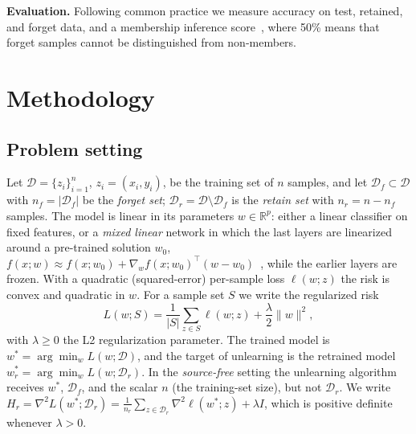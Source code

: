 \documentclass[10pt,twocolumn,letterpaper]{article}
\begin{document}
\noindent\textbf{Evaluation.} Following common practice we measure accuracy on test, retained, and forget data, and a membership inference score~\cite{shokri2017membership}, where 50\% means that forget samples cannot be distinguished from non-members.

\section{Methodology}
\label{sec:method}
\subsection{Problem setting}
\label{sec:setting}
Let $\mathcal D=\{z_i\}_{i=1}^{n}$, $z_i=(x_i,y_i)$, be the training set of $n$ samples, and let $\mathcal D_f\subset\mathcal D$ with $n_f=|\mathcal D_f|$ be the \emph{forget set}; $\mathcal D_r=\mathcal D\setminus\mathcal D_f$ is the \emph{retain set} with $n_r=n-n_f$ samples. The model is linear in its parameters $w\in\mathbb R^{p}$: either a linear classifier on fixed features, or a \emph{mixed linear} network in which the last layers are linearized around a pre-trained solution $w_0$, $f(x;w)\approx f(x;w_0)+\nabla_w f(x;w_0)^\top(w-w_0)$~\cite{golatkar2021mixed,lee2019wide}, while the earlier layers are frozen. With a quadratic (squared-error) per-sample loss $\ell(w;z)$ the risk is convex and quadratic in $w$. For a sample set $S$ we write the regularized risk
\begin{equation}
  L(w;S)=\frac1{|S|}\sum_{z\in S}\ell(w;z)+\frac\lambda2\|w\|^2,
  \label{eq:risk}
\end{equation}
with $\lambda\ge 0$ the L2 regularization parameter. The trained model is $w^*=\arg\min_w L(w;\mathcal D)$, and the target of unlearning is the retrained model $w^*_r=\arg\min_w L(w;\mathcal D_r)$. In the \emph{source-free} setting the unlearning algorithm receives $w^*$, $\mathcal D_f$, and the scalar $n$ (the training-set size), but not $\mathcal D_r$. We write $H_r=\nabla^2L(w^*;\mathcal D_r)=\frac1{n_r}\sum_{z\in\mathcal D_r}\nabla^2\ell(w^*;z)+\lambda I$, which is positive definite whenever $\lambda>0$.
\end{document}
